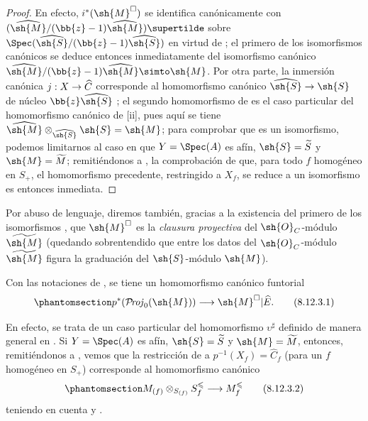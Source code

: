 \documentclass[oneside,10pt]{amsart}
\makeatletter
\renewcommand{\leq}{\leqslant}
\newcommand{\ega@arrow}[2]{\mathchoice{#1}{#2}{#2}{#2}}
\renewcommand{\to}{\ega@arrow{\longrightarrow}{\rightarrow}}
\def\shProj{\mathcal{P}\!\mathit{roj}}
\newcommand{\oldpage}[2][]{\marginnote{\normalfont\footnotesize\textbf{#1}~|~#2}\ignorespaces}
\let\EGAOriginalLabel\label
\renewcommand{\label}[1]{\phantomsection\EGAOriginalLabel{#1}}
\makeatother
\begin{document}
\begin{proof}
En efecto, $i^*(\sh{M}^\square)$ se identifica canónicamente con $(\widehat{\sh{M}}/(\bb{z}-1)\widehat{\sh{M}})\supertilde$ sobre $\Spec(\widehat{\sh{S}}/(\bb{z}-1)\widehat{\sh{S}})$ en virtud de ;
el primero de los isomorfismos canónicos  se deduce entonces inmediatamente  del isomorfismo canónico $\widehat{\sh{M}}/(\bb{z}-1)\widehat{\sh{M}}\simto\sh{M}$.
Por otra parte, la inmersión canónica $j:X\to\widehat{C}$ corresponde al homomorfismo canónico $\widehat{\sh{S}}\to\sh{S}$ de núcleo $\bb{z}\widehat{\sh{S}}$ ;
el segundo homomorfismo de  es el caso particular del homomorfismo canónico de [ii], pues aquí se tiene $\widehat{\sh{M}}\otimes_{\widehat{\sh{S}}}\sh{S}=\sh{M}$;
para comprobar que es un isomorfismo, podemos limitarnos al caso en que $Y=\Spec(A)$ es afín, $\sh{S}=\widetilde{S}$ y $\sh{M}=\widetilde{M}$;
remitiéndonos a , la comprobación de que, para todo $f$ homogéneo en $S_+$, el homomorfismo precedente, restringido a $X_f$, se reduce a un isomorfismo es entonces inmediata.
\end{proof}
\oldpage[II]{193}

Por abuso de lenguaje, diremos también, gracias a la existencia del primero de los isomorfismos , que $\sh{M}^\square$ es la \emph{clausura proyectiva} del $\sh{O}_C$-módulo $\widetilde{\sh{M}}$ (quedando sobrentendido que entre los datos del $\sh{O}_C$-módulo $\widetilde{\sh{M}}$ figura la graduación del $\sh{S}$-módulo $\sh{M}$).

\begin{env}[8.12.3]
\label{II.8.12.3}
Con las notaciones de , se tiene un homomorfismo canónico funtorial
\[
\label{II.8.12.3.1}
    p^*(\shProj_0(\sh{M}))\to\sh{M}^\square|\widehat{E}.
\tag{8.12.3.1}
\]

En efecto, se trata de un caso particular del homomorfismo $\upsilon^\sharp$ definido de manera general en .
Si $Y=\Spec(A)$ es afín, $\sh{S}=\widetilde{S}$ y $\sh{M}=\widetilde{M}$, entonces, remitiéndonos a , vemos que la restricción de  a $p^{-1}(X_f)=\widehat{C}_f$ (para un $f$ homogéneo en $S_+$) corresponde al homomorfismo canónico
\[
\label{II.8.12.3.2}
    M_{(f)}\otimes_{S_{(f)}}S_f^\leq \to M_f^\leq
\tag{8.12.3.2}
\]
teniendo en cuenta  y .
\end{env}
\end{document}
